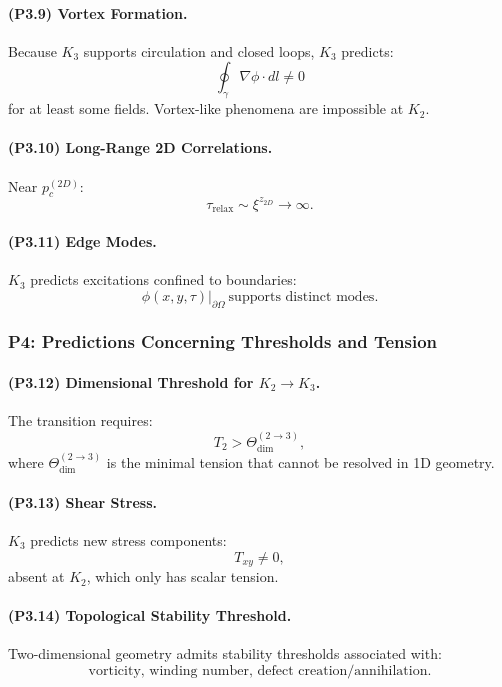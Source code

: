 \paragraph{(P3.9) Vortex Formation.}
Because $K_3$ supports circulation and closed loops, $K_3$ predicts:
\[
\oint_\gamma \nabla \phi \cdot dl \neq 0
\]
for at least some fields.  
Vortex-like phenomena are impossible at $K_2$.

\paragraph{(P3.10) Long-Range 2D Correlations.}
Near $p_c^{(2D)}$:
\[
\tau_{\mathrm{relax}} \sim \xi^{z_{2D}} \to \infty.
\]

\paragraph{(P3.11) Edge Modes.}
$K_3$ predicts excitations confined to boundaries:
\[
\phi(x,y,\tau)|_{\partial\Omega} \ \text{supports distinct modes}.
\]

\subsubsection{P4: Predictions Concerning Thresholds and Tension}

\paragraph{(P3.12) Dimensional Threshold for \texorpdfstring{$K_2\to K_3$}{K_2\to K_3}.}
The transition requires:
\[
T_2 > \Theta_{\mathrm{dim}}^{(2\to3)},
\]
where $\Theta_{\mathrm{dim}}^{(2\to3)}$ is the minimal tension that cannot be
resolved in 1D geometry.

\paragraph{(P3.13) Shear Stress.}
$K_3$ predicts new stress components:
\[
T_{xy} \neq 0,
\]
absent at $K_2$, which only has scalar tension.

\paragraph{(P3.14) Topological Stability Threshold.}
Two-dimensional geometry admits stability thresholds associated with:
\[
\text{vorticity, winding number, defect creation/annihilation}.
\]


